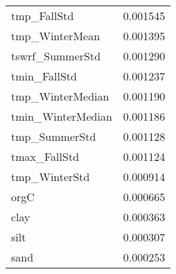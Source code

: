 \begin{tabular}{lr}
tmp_FallStd & 0.001545 \\
tmp_WinterMean & 0.001395 \\
tswrf_SummerStd & 0.001290 \\
tmin_FallStd & 0.001237 \\
tmp_WinterMedian & 0.001190 \\
tmin_WinterMedian & 0.001186 \\
tmp_SummerStd & 0.001128 \\
tmax_FallStd & 0.001124 \\
tmp_WinterStd & 0.000914 \\
orgC & 0.000665 \\
clay & 0.000363 \\
silt & 0.000307 \\
sand & 0.000253 \\
\bottomrule
\end{tabular}
